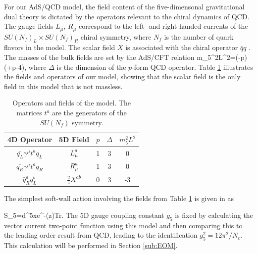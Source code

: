 For our AdS/QCD model, the field content of the five-dimensonal gravitational dual theory is dictated by the operators relevant to the chiral dynamics of QCD. 
The gauge fields $L_{\mu},\, R_{\mu}$ correspond to the left- and right-handed currents of the $SU(N_{f})_{L}\times SU(N_{f})_{R}$ chiral symmetry, where $N_{f}$ is the number of quark flavors in
the model. 
The scalar field $X$ is associated with the chiral operator $\bar{q}q$ \cite{stephanov-katz-son}. 
The masses of the bulk fields are set by the AdS/CFT relation \cite{colangelo2008} 
\be
m_{5}^{2}L^{2}=(\Delta-p)(\Delta+p-4), 
\ee
where $\Delta$ is the dimension of the $p$-form QCD operator. 
Table \ref{tab:Operators-and-fields} illustrates the fields and operators of our model, showing that the scalar field is the only field in this model that is not massless.

\begin{table}[htb]
\begin{center}
\begin{tabular}{|c|c|c|c|c|}
\hline 
4D Operator & 5D Field & $p$ & $\Delta$ & $m_{5}^{2}L^{2}$\\
\hline 
\hline 
$\bar{q_{L}}\gamma^{\mu}t^{a}q_{L}$ & $L_{\mu}^{a}$ & 1 & 3 & 0\\
\hline 
$\bar{q_{R}}\gamma^{\mu}t^{a}q_{R}$ & $R_{\mu}^{a}$ & 1 & 3 & 0\\
\hline 
$\bar{q}_{R}^{a}q_{L}^{b}$ & $\frac{2}{z}X^{ab}$ & 0 & 3 & -3\\
\hline 
\end{tabular}
\end{center}
\caption{Operators and fields of the model. The matrices $t^{a}$ are the generators of the $SU(N_{f})$ symmetry. 
\label{tab:Operators-and-fields}}
\end{table}

The simplest soft-wall action involving the fields from Table \ref{tab:Operators-and-fields}
is given in \cite{karch-katz-son-adsqcd} as 

\be
S_{5}=\int d^{5}xe^{-\Phi(z)}Tr.
\label{eq:SimpleAction}
\ee
The 5D gauge coupling constant $g_{5}$ is fixed by calculating the vector current two-point function using this model and then comparing this to the leading order result from QCD, leading to the identification $g_{5}^{2}=12\pi^{2}/N_{c}$.
This calculation will be performed in Section \ref{sub:EOM}. 

